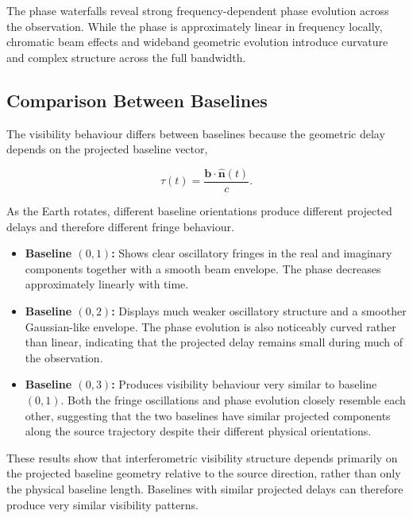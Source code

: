 \documentclass{article}
\begin{document}
The phase waterfalls reveal strong frequency-dependent phase evolution across the observation. While the phase is approximately linear in frequency locally, chromatic beam effects and wideband geometric evolution introduce curvature and complex structure across the full bandwidth.

\FloatBarrier

\subsection{Comparison Between Baselines}

The visibility behaviour differs between baselines because the geometric delay depends on the projected baseline vector,

\[
\tau(t)=\frac{\mathbf{b}\cdot\hat{\mathbf{n}}(t)}{c}.
\]

As the Earth rotates, different baseline orientations produce different projected delays and therefore different fringe behaviour.

\begin{itemize}

\item \textbf{Baseline $(0,1)$:}  
Shows clear oscillatory fringes in the real and imaginary components together with a smooth beam envelope. The phase decreases approximately linearly with time.

\item \textbf{Baseline $(0,2)$:}  
Displays much weaker oscillatory structure and a smoother Gaussian-like envelope. The phase evolution is also noticeably curved rather than linear, indicating that the projected delay remains small during much of the observation.

\item \textbf{Baseline $(0,3)$:}  
Produces visibility behaviour very similar to baseline $(0,1)$. Both the fringe oscillations and phase evolution closely resemble each other, suggesting that the two baselines have similar projected components along the source trajectory despite their different physical orientations.

\end{itemize}

These results show that interferometric visibility structure depends primarily on the projected baseline geometry relative to the source direction, rather than only the physical baseline length. Baselines with similar projected delays can therefore produce very similar visibility patterns.
\end{document}
